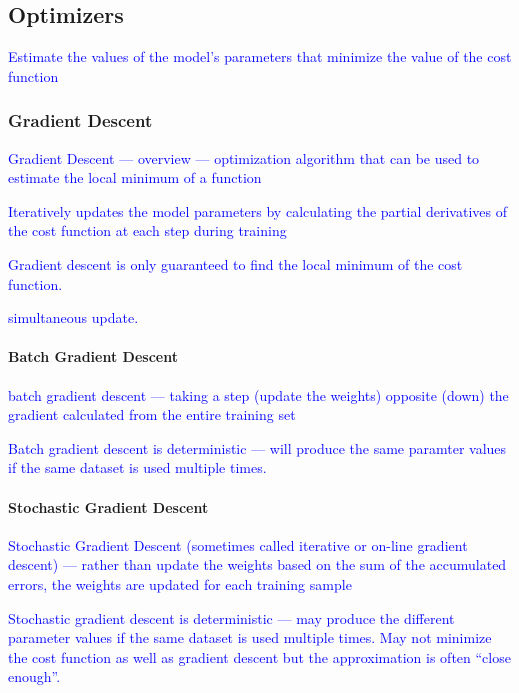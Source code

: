 \subsection{Optimizers}

\textcolor{blue}{Estimate the values of the model's parameters that minimize the value of the cost function}

\subsubsection{Gradient Descent}

\textcolor{blue}{Gradient Descent --- overview --- optimization algorithm that can be used to estimate the local minimum of a function}

\textcolor{blue}{Iteratively updates the model parameters by calculating the partial derivatives of the cost function at each step during training}

\textcolor{blue}{Gradient descent is only guaranteed to find the local minimum of the cost function.}

\textcolor{blue}{simultaneous update.}


\paragraph{Batch Gradient Descent}

\textcolor{blue}{batch gradient descent --- taking a step (update the weights) opposite (down) the gradient calculated from the entire training set}

\textcolor{blue}{Batch gradient descent is deterministic --- will produce the same paramter values if the same dataset is used multiple times.}


\paragraph{Stochastic Gradient Descent}

\textcolor{blue}{Stochastic Gradient Descent (sometimes called iterative or on-line gradient descent) --- rather than update the weights based on the sum of the accumulated errors, the weights are updated for each training sample}

\textcolor{blue}{Stochastic gradient descent is deterministic --- may produce the different parameter values if the same dataset is used multiple times. May not minimize the cost function as well as gradient descent but the approximation is often ``close enough''.}


